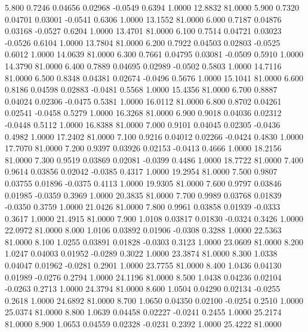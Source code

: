    5.800   0.7246   0.04656   0.02968  -0.0549   0.6394   1.0000  12.8832  81.0000
   5.900   0.7320   0.04701   0.03001  -0.0541   0.6306   1.0000  13.1552  81.0000
   6.000   0.7187   0.04876   0.03168  -0.0527   0.6204   1.0000  13.4701  81.0000
   6.100   0.7514   0.04721   0.03023  -0.0526   0.6104   1.0000  13.7804  81.0000
   6.200   0.7922   0.04503   0.02803  -0.0525   0.6012   1.0000  14.0639  81.0000
   6.300   0.7661   0.04795   0.03081  -0.0509   0.5910   1.0000  14.3790  81.0000
   6.400   0.7889   0.04695   0.02989  -0.0502   0.5803   1.0000  14.7116  81.0000
   6.500   0.8348   0.04381   0.02674  -0.0496   0.5676   1.0000  15.1041  81.0000
   6.600   0.8186   0.04598   0.02883  -0.0481   0.5568   1.0000  15.4356  81.0000
   6.700   0.8887   0.04024   0.02306  -0.0475   0.5381   1.0000  16.0112  81.0000
   6.800   0.8702   0.04261   0.02541  -0.0458   0.5279   1.0000  16.3268  81.0000
   6.900   0.9018   0.04036   0.02312  -0.0448   0.5112   1.0000  16.8388  81.0000
   7.000   0.9101   0.04045   0.02305  -0.0436   0.4982   1.0000  17.2402  81.0000
   7.100   0.9216   0.04012   0.02266  -0.0424   0.4830   1.0000  17.7070  81.0000
   7.200   0.9397   0.03926   0.02153  -0.0413   0.4666   1.0000  18.2156  81.0000
   7.300   0.9519   0.03869   0.02081  -0.0399   0.4486   1.0000  18.7722  81.0000
   7.400   0.9614   0.03856   0.02042  -0.0385   0.4317   1.0000  19.2954  81.0000
   7.500   0.9807   0.03755   0.01896  -0.0375   0.4113   1.0000  19.9305  81.0000
   7.600   0.9797   0.03846   0.01985  -0.0359   0.3969   1.0000  20.3835  81.0000
   7.700   0.9989   0.03768   0.01839  -0.0350   0.3759   1.0000  21.0426  81.0000
   7.800   0.9961   0.03858   0.01939  -0.0333   0.3617   1.0000  21.4915  81.0000
   7.900   1.0108   0.03817   0.01830  -0.0324   0.3426   1.0000  22.0972  81.0000
   8.000   1.0106   0.03892   0.01906  -0.0308   0.3288   1.0000  22.5363  81.0000
   8.100   1.0255   0.03891   0.01828  -0.0303   0.3123   1.0000  23.0609  81.0000
   8.200   1.0247   0.04003   0.01952  -0.0289   0.3022   1.0000  23.3874  81.0000
   8.300   1.0338   0.04047   0.01962  -0.0281   0.2901   1.0000  23.7755  81.0000
   8.400   1.0436   0.04130   0.01989  -0.0276   0.2794   1.0000  24.1196  81.0000
   8.500   1.0438   0.04236   0.02104  -0.0263   0.2713   1.0000  24.3794  81.0000
   8.600   1.0504   0.04290   0.02134  -0.0255   0.2618   1.0000  24.6892  81.0000
   8.700   1.0650   0.04350   0.02100  -0.0254   0.2510   1.0000  25.0374  81.0000
   8.800   1.0639   0.04458   0.02227  -0.0241   0.2455   1.0000  25.2174  81.0000
   8.900   1.0653   0.04559   0.02328  -0.0231   0.2392   1.0000  25.4222  81.0000
